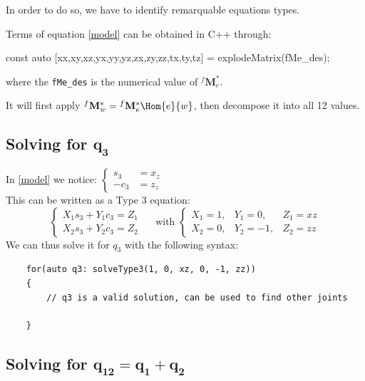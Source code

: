 \documentclass{ecnreport}
\begin{document}
In order to do so, we have to identify remarquable equations types.

Terms of equation \eqref{model} can be obtained in C++ through:
\begin{cppcode}
 const auto [xx,xy,xz,yx,yy,yz,zx,zy,zz,tx,ty,tz] = explodeMatrix(fMe_des);
\end{cppcode}
where the \texttt{fMe\_des} is the numerical value of ${}^f\mathbf{M}_e^*$.

It will first apply ${}^f\mathbf{M}_w^* = {}^f\mathbf{M}_e^* \Hom{e}{w}$, then decompose it into all 12 values.



\subsection*{Solving for $\mathbf{q_3}$}

In \eqref{model} we notice: $\left\{\begin{array}{ll}s_3 &= x_z \\ -c_3 &= z_z\end{array}\right.$  \\
This can be written as a Type 3 equation:
\begin{equation*}
\left\{\begin{array}{l}X_1s_3+Y_1c_3 = Z_1 \\ X_2s_3+Y_2c_3 = Z_2\end{array}\right. \quad \text{ with } 
\left\{\begin{array}{ccc}
        X_1 = 1, & Y_1 = 0, & Z_1 = xz \\X_2 = 0, & Y_2 = -1, & Z_2 = zz
        \end{array}\right.
        \label{eq:q3}
\end{equation*} 
We can thus solve it for $q_3$ with the following syntax:
\begin{center}
    \cppstyle \raggedright
    \begin{lstlisting}
    for(auto q3: solveType3(1, 0, xz, 0, -1, zz))
    {
        // q3 is a valid solution, can be used to find other joints        
    
    }
    \end{lstlisting}
\end{center}

\subsection*{Solving for $\mathbf{q_{12} = q_1+q_2}$}
\end{document}
